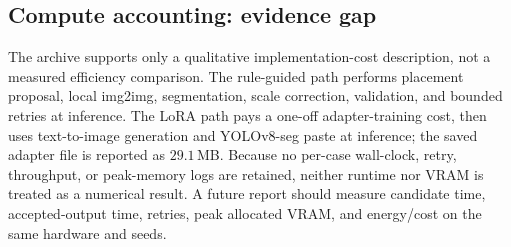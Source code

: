 \documentclass[11pt,a4paper]{article}
\begin{document}
\subsection{Compute accounting: evidence gap}\label{sec:efficiency}
The archive supports only a qualitative implementation-cost description, not a
measured efficiency comparison. The rule-guided path performs placement proposal,
local img2img, segmentation, scale correction, validation, and bounded retries at
inference. The LoRA path pays a one-off adapter-training cost, then uses
text-to-image generation and YOLOv8-seg paste at inference; the saved adapter file
is reported as $29.1$\,MB. Because no per-case wall-clock, retry, throughput, or
peak-memory logs are retained, neither runtime nor VRAM is treated as a numerical
result. A future report should measure candidate time, accepted-output time,
retries, peak allocated VRAM, and energy/cost on the same hardware and seeds.
\end{document}
